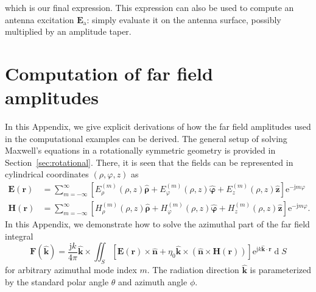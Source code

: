 \documentclass[a4paper,12pt]{article}
\renewcommand{\vec}[1]{\boldsymbol{#1}}
\newcommand{\unitvec}[1]{\hat{\vec{#1}}}
\newcommand{\mrm}[1]{\mathrm{#1}}
\newcommand{\diff}{\operatorname{d}\!}
\newcommand{\ju}{\mrm{j}}
\newcommand{\eu}{\mrm{e}}
\newcommand{\Ev}{\vec{E}}
\newcommand{\Hv}{\vec{H}}
\newcommand{\Fv}{\vec{F}}
\newcommand{\rv}{\vec{r}}
\newcommand{\zuv}{\unitvec{z}}
\newcommand{\nuv}{\unitvec{n}}
\newcommand{\kuv}{\unitvec{k}}
\newcommand{\rhouv}{\unitvec{\rho}}
\newcommand{\varphiuv}{\unitvec{\varphi}}
\begin{document}
which is our final expression. This expression can also be used to
compute an antenna excitation $\Ev_{\mrm{a}}$: simply evaluate it on
the antenna surface, possibly multiplied by an amplitude taper.

\section{Computation of far field amplitudes}
\label{app:farfield}

In this Appendix, we give explicit derivations of how the far field
amplitudes used in the computational examples can be derived. The
general setup of solving Maxwell's equations in a rotationally
symmetric geometry is provided in Section~\ref{sec:rotational}. There,
it is seen that the fields can be represented in cylindrical
coordinates $(\rho,\varphi,z)$ as
\begin{align}
  \Ev(\rv) &= \sum_{m=-\infty}^{\infty} \left[E_{\rho}^{(m)}(\rho,z)\rhouv + E_{\varphi}^{(m)}(\rho,z)\varphiuv + E_{z}^{(m)}(\rho,z)\zuv \right] \eu^{-\ju m\varphi} \\
  \Hv(\rv) &= \sum_{m=-\infty}^{\infty} \left[H_{\rho}^{(m)}(\rho,z)\rhouv + H_{\varphi}^{(m)}(\rho,z)\varphiuv + H_{z}^{(m)}(\rho,z)\zuv \right] \eu^{-\ju m\varphi}.
\end{align}
In this Appendix, we demonstrate how to solve the azimuthal part of
the far field integral 
\begin{equation}
  \Fv(\kuv) = \frac{\ju k}{4\pi} \kuv\times \iint_{S} \left[ \Ev(\rv)\times\nuv + \eta_{0}\kuv\times(\nuv\times\Hv(\rv)) \right] \eu^{\ju k\kuv\cdot\rv} \diff S
\end{equation}
for arbitrary azimuthal mode index $m$. The radiation direction $\kuv$
is parameterized by the standard polar angle $\theta$ and azimuth
angle $\phi$.
\end{document}
